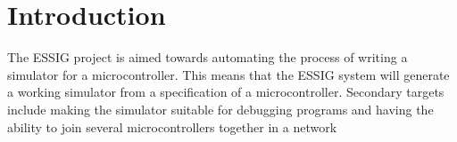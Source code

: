 \chapter{Introduction}
The \ac{ESSIG} project is aimed towards automating the process of
writing a simulator for a microcontroller. This means that the
\ac{ESSIG} system will generate a working simulator from a specification
of a microcontroller. Secondary
targets include making the simulator suitable for debugging programs and
having the ability to join several microcontrollers together in a
network

